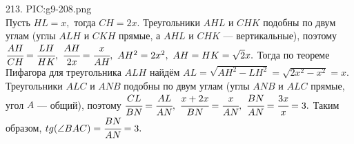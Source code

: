 213. {{PIC:g9-208.png}}\\
Пусть  $HL=x,$ тогда $CH=2x.$ Треугольники $AHL$ и $CHK$ подобны по двум углам (углы $ALH$ и $CKH$ прямые, а $AHL$ и $CHK$ --- вертикальные), поэтому $\cfrac{AH}{CH}=\cfrac{LH}{HK},\ \cfrac{AH}{2x}=\cfrac{x}{AH},\ AH^2=2x^2,\ AH=HK=\sqrt{2}x.$ Тогда по теореме Пифагора для треугольника $ALH$ найдём $AL=\sqrt{AH^2-LH^2}=\sqrt{2x^2-x^2}=x.$ Треугольники $ALC$ и $ANB$ подобны по двум углам (углы $ANB$ и $ALC$ прямые, угол $A$ --- общий), поэтому
$\cfrac{CL}{BN}=\cfrac{AL}{AN},\ \cfrac{x+2x}{BN}=\cfrac{x}{AN},\ \cfrac{BN}{AN}=\cfrac{3x}{x}=3.$ Таким образом, $tg(\angle BAC)=\cfrac{BN}{AN}=3.$\\

